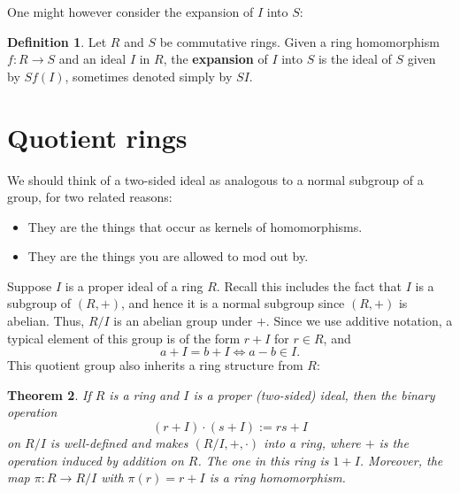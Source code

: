 \documentclass[12pt]{report}
\newtheorem{theorem}{Theorem}[chapter]
\numberwithin{equation}{section}
\numberwithin{theorem}{chapter}
\theoremstyle{definition}
\newtheorem{definition}[theorem]{Definition}
\newtheorem*{basic properties}{Basic Properties}
\newtheorem*{Important Remark}{Important Remark}
\begin{document}
One might however consider the expansion of $I$ into $S$:

\begin{definition}
	Let $R$ and $S$ be commutative rings. Given a ring homomorphism $f\!: R \to S$ and an ideal $I$ in $R$, the {\bf expansion} of $I$ into $S$ is the ideal of $S$ given by $Sf(I)$, sometimes denoted simply by $SI$.
\end{definition}





\section{Quotient rings}

We should think of a two-sided ideal as analogous to a normal subgroup of a group, for two related reasons:
\begin{itemize}[itemsep=-0.1em]
	\item They are the things that occur as kernels of homomorphisms.
	\item They are the things you are allowed to mod out by.
\end{itemize}


Suppose $I$ is a proper ideal of a ring $R$. Recall this includes the fact that $I$ is a subgroup of $(R, +)$, and hence it is a normal subgroup since $(R, +)$ is abelian.
Thus, $R/I$ is an abelian group under $+$. Since we use additive notation, a typical element of this group is of the form $r + I$ for $r \in R$, and
$$a+I = b+I \iff a-b \in I.$$
This quotient group also inherits a ring structure from $R$:

\begin{theorem} 
If $R$ is a ring and $I$ is a proper (two-sided) ideal, then the binary operation 
$$(r + I) \cdot (s +I) := rs + I$$
on $R/I$ is well-defined and makes $(R/I, +, \cdot)$ into a ring, where $+$ is the operation induced by addition on $R$. The one in this ring is $1+I$.  Moreover, the map $\pi\!: R \to R/I$ with $\pi(r) = r +I$ is a ring homomorphism.
\end{theorem}
\end{document}
